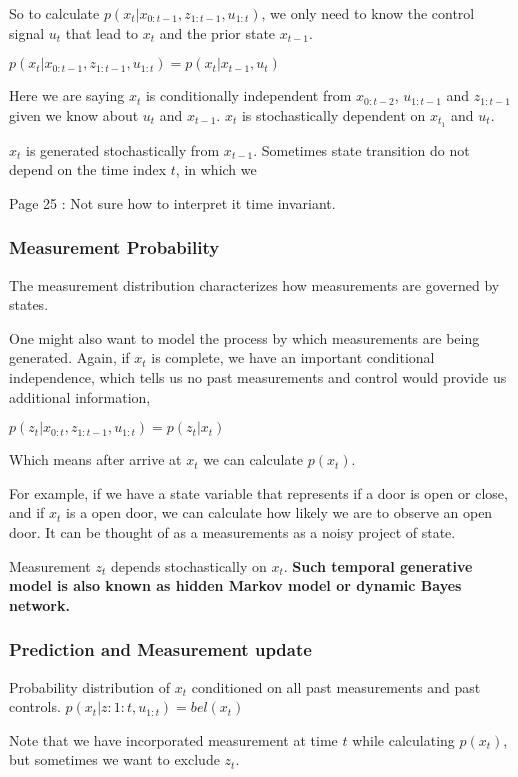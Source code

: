 \documentclass{article}
\begin{document}
So to calculate $p(x_t | x_{0:t-1}, z_{1:t-1}, u_{1:t})$, we only need to know the control signal $u_t$ that lead to $x_t$ and the prior state $x_{t-1}$.

$p(x_t | x_{0:t-1}, z_{1:t-1}, u_{1:t}) = p(x_t | x_{t-1}, u_t)$

Here we are saying $x_t$ is conditionally independent from $x_{0:t-2}$, $u_{1:t-1}$ and $z_{1:t-1}$ given we know about $u_t$ and $x_{t-1}$.  $x_t$ is stochastically dependent on $x_{t_1}$ and $u_t$.

$x_t$ is generated stochastically from $x_{t-1}$. Sometimes state transition do not depend on the time index $t$, in which we

Page 25 : Not sure how to interpret it time invariant.

\subsubsection{Measurement Probability}
The measurement distribution characterizes how measurements are governed by states.

One might also want to model the process by which measurements are being generated. Again, if $x_t$ is complete, we have an important conditional independence, which tells us no past measurements and control would provide us additional information,

$p(z_t | x_{0:t}, z_{1:t-1}, u_{1:t}) = p(z_t | x_t)$

Which means after arrive at $x_t$ we can calculate $p(x_t)$.

For example, if we have a state variable that represents if a door is open or close, and if $x_t$ is a open door, we can calculate how likely we are to observe an open door. It can be thought of as a measurements as a noisy project of state.

Measurement $z_t$ depends stochastically on $x_t$.
\textbf{Such temporal generative model is also known as hidden Markov model or dynamic Bayes network.}

\subsubsection{Prediction and Measurement update}
Probability distribution of $x_t$ conditioned on all past measurements and past controls.
$p(x_t |z:{1:t}, u_{1:t}) = bel(x_t)$

Note that we have incorporated measurement at time $t$ while calculating $p(x_t)$, but sometimes we want to exclude $z_t$. 
\end{document}
